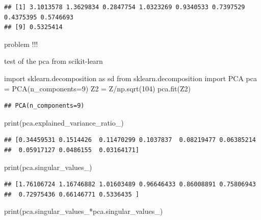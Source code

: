 \documentclass[
  10pt,
]{article}
\newenvironment{Shaded}{\begin{snugshade}}{\end{snugshade}}
\newcommand{\NormalTok}[1]{#1}
\begin{document}
\begin{Shaded}
\end{Shaded}

\begin{verbatim}
## [1] 3.1013578 1.3629834 0.2847754 1.0323269 0.9340533 0.7397529 0.4375395 0.5746693
## [9] 0.5325414
\end{verbatim}

problem !!!

test of the pca from scikit-learn

\begin{Shaded}
\begin{Highlighting}[]
\NormalTok{import sklearn.decomposition as sd}
\NormalTok{from sklearn.decomposition import PCA}
\NormalTok{pca = PCA(n\_components=9)}
\NormalTok{Z2 = Z/np.sqrt(104)}
\NormalTok{pca.fit(Z2)}
\end{Highlighting}
\end{Shaded}

\begin{verbatim}
## PCA(n_components=9)
\end{verbatim}

\begin{Shaded}
\begin{Highlighting}[]
\NormalTok{print(pca.explained\_variance\_ratio\_)}
\end{Highlighting}
\end{Shaded}

\begin{verbatim}
## [0.34459531 0.1514426  0.11470299 0.1037837  0.08219477 0.06385214
##  0.05917127 0.0486155  0.03164171]
\end{verbatim}

\begin{Shaded}
\begin{Highlighting}[]
\NormalTok{print(pca.singular\_values\_)}
\end{Highlighting}
\end{Shaded}

\begin{verbatim}
## [1.76106724 1.16746882 1.01603489 0.96646433 0.86008891 0.75806943
##  0.72975436 0.66146771 0.5336435 ]
\end{verbatim}

\begin{Shaded}
\begin{Highlighting}[]
\NormalTok{print(pca.singular\_values\_*pca.singular\_values\_)}
\end{Highlighting}
\end{Shaded}
\end{document}
